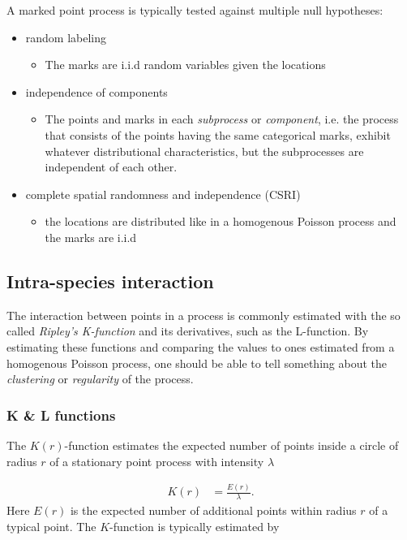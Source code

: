 \documentclass[12pt,a4paper,oneside,article]{memoir}
\begin{document}
A marked point process is typically tested against multiple null hypotheses:
\begin{itemize}
  \item random labeling
  	\begin{itemize}
  		\item The marks are i.i.d random variables given the locations
	\end{itemize}
	\item independence of components
	\begin{itemize}
  		\item The points and marks in each \emph{subprocess} or \emph{component}, i.e. the process that consists of the
  		points having the same categorical marks, exhibit whatever distributional characteristics, but the subprocesses are independent of each
  		other.
	\end{itemize}
	\item complete spatial randomness and independence (CSRI)
	\begin{itemize}
  		\item the locations are distributed like in a homogenous Poisson process and the marks
  		are i.i.d 
	\end{itemize}
\end{itemize}

\subsection{Intra-species interaction}

The interaction between points in a process is commonly estimated
with the so called \emph{Ripley's K-function} and its derivatives,
such as the L-function. By estimating these functions and comparing
the values to ones estimated from a homogenous Poisson process, one
should be able to tell something about the \emph{clustering} or \emph{regularity}
of the process.

\subsubsection{K \& L functions}

The $K(r)$-function estimates the expected number of points
inside a circle of radius $r$ of a stationary point process with intensity $\lambda$

\begin{align}
	K(r)&=\frac{E(r)}{\lambda}.
	\label{eq:K}
\end{align}
Here $E(r)$ is the expected number of additional points within radius $r$ 
of a typical point. The $K$-function is typically estimated by
\end{document}
